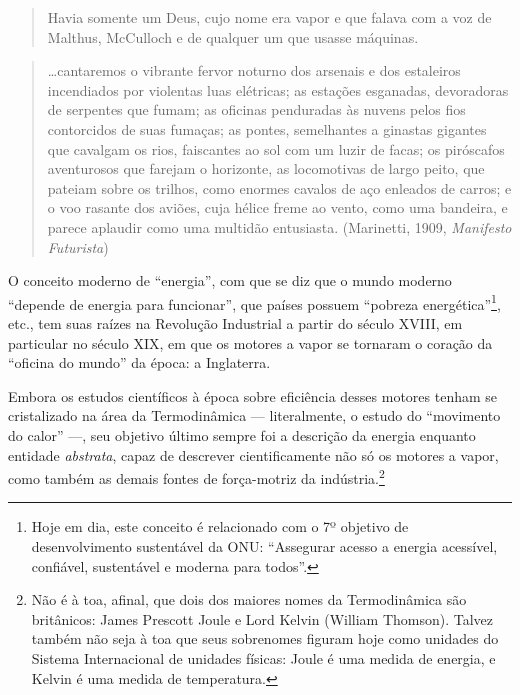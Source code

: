 \documentclass[12pt]{article}
\title{}
\author{}
\date{2026-09-12}
\numberwithin{equation}{section}
\theoremstyle{plain}
\theoremstyle{definition}
\theoremstyle{remark}
\begin{document}
\maketitle

\begin{quote}
Havia somente um Deus, cujo nome era vapor e que falava com a voz de Malthus, McCulloch e de qualquer um que usasse máquinas. \parencite[p. 294]{Hobsbawm2014}
\end{quote}

\begin{quote}
\ldots cantaremos o vibrante fervor noturno dos arsenais e dos estaleiros incendiados por violentas luas elétricas; as estações esganadas, devoradoras de serpentes que fumam; as oficinas penduradas às nuvens pelos fios contorcidos de suas fumaças; as pontes, semelhantes a ginastas gigantes que cavalgam os rios, faiscantes ao sol com um luzir de facas; os piróscafos aventurosos que farejam o horizonte, as locomotivas de largo peito, que pateiam sobre os trilhos, como enormes cavalos de aço enleados de carros; e o voo rasante dos aviões, cuja hélice freme ao vento, como uma bandeira, e parece aplaudir como uma multidão entusiasta. (Marinetti, 1909, \emph{Manifesto Futurista})
\end{quote}

O conceito moderno de ``energia'', com que se diz que o mundo moderno ``depende de energia para funcionar'', que países possuem ``pobreza energética''\footnote{Hoje em dia, este conceito é relacionado com o 7º objetivo de desenvolvimento sustentável da ONU: ``Assegurar acesso a energia acessível, confiável, sustentável e moderna para todos''.}, etc., tem suas raízes na Revolução Industrial a partir do século XVIII, em particular no século XIX, em que os motores a vapor se tornaram o coração da ``oficina do mundo'' da época: a Inglaterra.

Embora os estudos científicos à época sobre eficiência desses motores tenham se cristalizado na área da Termodinâmica --- literalmente, o estudo do ``movimento do calor'' ---, seu objetivo último sempre foi a descrição da energia enquanto entidade \emph{abstrata}, capaz de descrever cientificamente não só os motores a vapor, como também as demais fontes de força-motriz da indústria.\footnote{Não é à toa, afinal, que dois dos maiores nomes da Termodinâmica são britânicos: James Prescott Joule e Lord Kelvin (William Thomson). Talvez também não seja à toa que seus sobrenomes figuram hoje como unidades do Sistema Internacional de unidades físicas: Joule é uma medida de energia, e Kelvin é uma medida de temperatura.}
\end{document}
